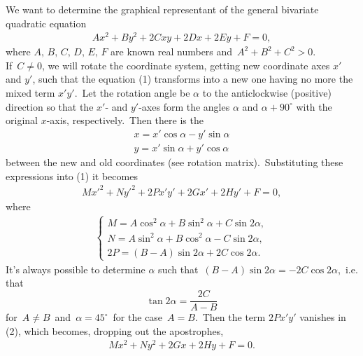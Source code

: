 \documentclass[12pt]{article}
\theoremstyle{definition}
\begin{document}
We want to determine the graphical representant of the general bivariate quadratic equation
\begin{align}
Ax^2+By^2+2Cxy+2Dx+2Ey+F = 0,
\end{align}
where $A,\,B,\,C,\,D,\,E,\,F$ are known real numbers and\, $A^2+B^2+C^2 > 0$.\\

If\, $C \neq 0$, we will rotate the coordinate system, getting new coordinate axes $x'$ and $y'$, such that the equation (1) transforms into a new one having no more the mixed term $x'y'$.\, Let the rotation angle be $\alpha$ to the anticlockwise (positive) direction so that the $x'$- and $y'$-axes form the angles $\alpha$ and $\alpha+90^\circ$ with the original $x$-axis, respectively.\, Then there is the 
\begin{align*}
x = x'\cos\alpha-y'\sin\alpha \\
y = x'\sin\alpha+y'\cos\alpha
\end{align*}
between the new and old coordinates (see rotation matrix).\, Substituting these expressions into (1) it becomes
\begin{align}
Mx'^2+Ny'^2+2Px'y'+2Gx'+2Hy'+F = 0,
\end{align}
where
\begin{align}
\begin{cases}
M = A\cos^2\alpha+B\sin^2\alpha+C\sin2\alpha,\\
N = A\sin^2\alpha+B\cos^2\alpha-C\sin2\alpha,\\
2P = (B-A)\sin2\alpha+2C\cos2\alpha.
\end{cases}
\end{align}
It's always possible to determine $\alpha$ such that\, $(B-A)\sin2\alpha = -2C\cos2\alpha$,\, i.e. that
$$\tan2\alpha = \frac{2C}{A-B}$$
for\, $A \neq B$\, and\, $\alpha = 45^\circ$\, for the case\, $A = B$.\, Then the term $2Px'y'$ vanishes in (2), which becomes, dropping out the apostrophes,
\begin{align}
Mx^2+Ny^2+2Gx+2Hy+F = 0.
\end{align}
\end{document}
